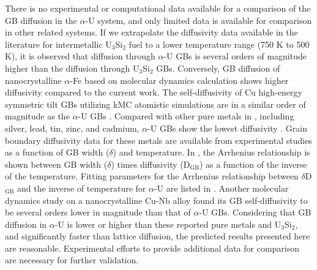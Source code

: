 \documentclass[review]{elsarticle}
\begin{document}
\par There is no experimental or computational data available for a comparison of the GB diffusion in the $\alpha$-U system, and only limited data is available for comparison in other related systems. If we extrapolate the diffusivity data available in the literature for intermetallic U$_\mathrm{3}$Si$_\mathrm{2}$ fuel to a lower temperature range (750 K to 500 K), it is observed that diffusion through $\alpha$-U GBs is several orders of magnitude higher than the diffusion through U$_\mathrm{3}$Si$_\mathrm{2}$ GBs. Conversely, GB diffusion of nanocrystalline $\alpha$-Fe based on molecular dynamics calculation shows higher diffusivity \cite{MOHAMMADZADEH201756} compared to the current work. The self-diffusivity of Cu high-energy symmetric tilt GBs utilizing kMC atomistic simulations are in a similar order of magnitude as the $\alpha$-U GBs \cite{Suzuki2003}. Compared with other pure metals in , including silver, lead, tin, zinc, and cadmium, $\alpha$-U GBs show the lowest diffusivity \cite{diffusion_compare}. Grain boundary diffusivity data for these metals are available from experimental studies as a function of GB width ($\delta$) and temperature. In , the Arrhenius relationship is shown between GB width ($\delta$) times diffusivity (D$_\mathrm{GB}$) as a function of the inverse of the temperature. Fitting parameters for the Arrhenius relationship between $\delta$D$_\mathrm{GB}$ and the inverse of temperature for $\alpha$-U are listed in . Another molecular dynamics study on a nanocrystalline Cu-Nb alloy found its GB self-diffusivity to be several orders lower in magnitude \cite{cu_nb} than that of $\alpha$-U GBs. Considering that GB diffusion in $\alpha$-U is lower or higher than these reported pure metals and U$_3$Si$_2$, and significantly faster than lattice diffusion, the predicted results presented here are reasonable. Experimental efforts to provide additional data for comparison are necessary for further validation. 
\end{document}
